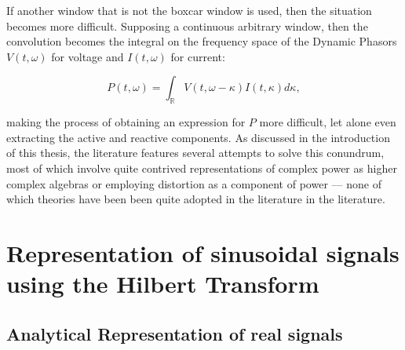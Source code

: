 	If another window that is not the boxcar window is used, then the situation becomes more difficult. Supposing a continuous arbitrary window, then the convolution becomes the integral on the frequency space of the Dynamic Phasors $V\left(t,\omega\right)$  for voltage and $I\left(t,\omega\right)$ for current:

\begin{equation} P\left(t,\omega\right) = \int_{\mathbb{R}} V\left(t,\omega - \kappa\right) I\left(t,\kappa\right) d\kappa ,\label{eq:stft_continuous_power_def}\end{equation}

	\noindent making the process of obtaining an expression for $P$ more difficult, let alone even extracting the active and reactive components. As discussed in the introduction of this thesis, the literature features several attempts to solve this conundrum, most of which involve quite contrived representations of complex power as higher complex algebras or employing distortion as a component of power — none of which theories have been been quite adopted in the literature in the literature.

\section{Representation of sinusoidal signals using the Hilbert Transform}\label{chapter:hilbert_transform} %

\subsection{Analytical Representation of real signals} %


